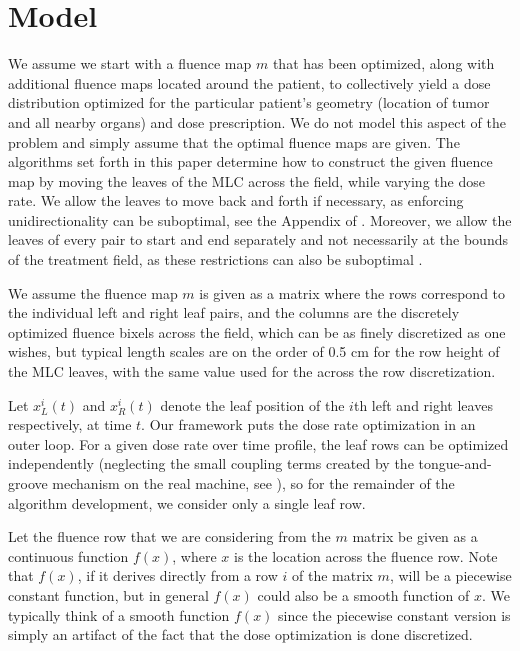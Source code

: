 \documentclass[12pt]{article}
\begin{document}
\section{Model}
We assume we start with a fluence map $m$
that has been optimized, along with additional fluence maps located around the patient, to collectively yield a dose distribution optimized for the particular patient's geometry (location of tumor and all nearby organs) and dose prescription. We do not model this aspect of the problem and simply assume that the optimal fluence maps are given. The algorithms set forth in this paper determine how to construct the given fluence map by moving the leaves of the MLC across the field, while varying the dose rate.
We allow the leaves to move back and forth if necessary, as enforcing unidirectionality can be suboptimal, see the Appendix of \cite{balvertcraft}.
Moreover, we allow the leaves of every pair to start and end separately and not necessarily at the bounds of the treatment field, as these restrictions can also be suboptimal \cite{thesisKvA}.

We assume the fluence map $m$ is given as a matrix where the rows correspond to the individual left and right leaf pairs, and the columns are the discretely optimized fluence bixels across the field, which can be as finely discretized as one wishes, but typical length scales are on the order of 0.5 cm for the row height of the MLC leaves, with the same value used for the across the row discretization.

Let $x^i_L(t)$ and $x^i_R(t)$ denote the leaf position of the $i$th left and right leaves respectively, at time $t$.
Our framework puts the dose rate optimization in an outer loop. For a given dose rate over time profile, the leaf rows can be optimized independently (neglecting the small coupling terms created by the tongue-and-groove mechanism on the real machine, see \cite{unkvmatreview}), so for the remainder of the algorithm development, we consider only a single leaf row.

Let the fluence row that we are considering from the $m$ matrix be given as a continuous function $f(x)$, where $x$ is the location across the fluence row. Note that $f(x)$, if it derives directly from a row $i$ of the matrix $m$, will be a piecewise constant function, but in general $f(x)$ could also be a smooth function of $x$. We typically think of a smooth function $f(x)$ since the piecewise constant version is simply an artifact of the fact that the dose optimization is done discretized.
\end{document}
